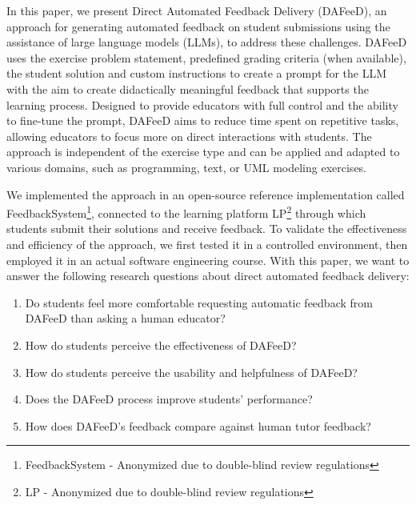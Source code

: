 \documentclass[sigconf,screen,review,anonymous]{acmart}
\begin{document}
In this paper, we present Direct Automated Feedback Delivery (DAFeeD), an approach for generating automated feedback on student submissions using the assistance of large language models (LLMs), to address these challenges.
DAFeeD uses the exercise problem statement, predefined grading criteria (when available), the student solution and custom instructions to create a prompt for the LLM with the aim to create didactically meaningful feedback that supports the learning process.
Designed to provide educators with full control and the ability to fine-tune the prompt, DAFeeD aims to reduce time spent on repetitive tasks, allowing educators to focus more on direct interactions with students.
The approach is independent of the exercise type and can be applied and adapted to various domains, such as programming, text, or UML modeling exercises.

We implemented the approach in an open-source reference implementation called FeedbackSystem\footnote{FeedbackSystem - Anonymized due to double-blind review regulations}, connected to the learning platform LP\footnote{LP - Anonymized due to double-blind review regulations} \cite{krusche:2018:ArTEMiSAutomaticAssessmentf} through which students submit their solutions and receive feedback.
To validate the effectiveness and efficiency of the approach, we first tested it in a controlled environment, then employed it in an actual software engineering course.
With this paper, we want to answer the following research questions about direct automated feedback delivery:

\begin{enumerate}[label=\textbf{RQ\arabic*},ref=RQ\arabic*]
  \item \label{RQ1} Do students feel more comfortable requesting automatic feedback from DAFeeD than asking a human educator?
  \item \label{RQ2} How do students perceive the effectiveness of DAFeeD?
  \item \label{RQ3} How do students perceive the usability and helpfulness of DAFeeD?
  \item \label{RQ4} Does the DAFeeD process improve students' performance?
  \item \label{RQ5} How does DAFeeD's feedback compare against human tutor feedback?
\end{enumerate}
\end{document}

